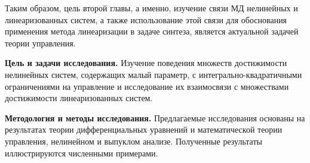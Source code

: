 \documentclass[../main.tex]{subfiles}
\begin{document}
Таким образом, цель второй главы, а именно, изучение связи МД нелинейных и линеаризованных систем, а также использование этой связи для обоснования применения метода линеаризации в задаче синтеза, является актуальной задачей теории управления.

\textbf{Цель и задачи исследования.} Изучение поведения множеств достижимости нелинейных систем, содержащих малый параметр, с интегрально-квадратичными ограничениями на управление и исследование их взаимосвязи с множествами достижимости линеаризованных систем.

\textbf{Методология и методы исследования.} Предлагаемые исследования основаны на результатах теории дифференциальных уравнений и математической теории управления, нелинейном и выпуклом анализе.
Полученные результаты иллюстрируются численными примерами.
\end{document}
